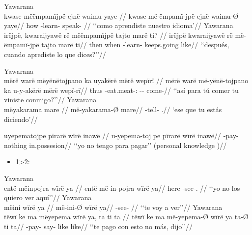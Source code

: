 \documentclass{memoir}
\begin{document}
\pex\label{learn}    \a Yawarana\\
    \label{convhistfamsjm-15}        \begingl
        \glpreamble kwase mëëmpamïjpë ejnë waimu yaye //
        \gla kwase më-ëmpamï-jpë ejnë waimu-Ø yaye//
        \glb how -learn-  speak- //
            \glft ‘‘como aprendiste nuestro idioma’//  
        \endgl 
    \a Yawarana\\
    \label{convhistfamsjm-238}        \begingl
        \glpreamble irëjpë, kwaraijyawë rë mëëmpamïjpë tajto marë ti? //
        \gla irëjpë kwaraijyawë rë më-ëmpamï-jpë tajto marë ti//
        \glb then when  -learn-  keeps.going like//
            \glft ‘‘después, cuando aprediste lo que dices?’’//  
        \endgl 
\xe

\pex\label{2sub}    \a Yawarana\\
    \label{convfemgrme-43}        \begingl
        \glpreamble mërë warë mëyënëtojpano ka uyakërë mërë wepïrï //
        \gla mërë warë më-yënë-tojpano ka u-y-akërë mërë wepï-rï//
        \glb {} thus -eat.meat-:  --  come-//
            \glft ‘‘así para tú comer tu viniste conmigo?’’//  
        \endgl 
    \a Yawarana\\
    \label{ctoaragrme-5}        \begingl
        \glpreamble mëyakarama mare //
        \gla më-yakarama-Ø mare//
        \glb {}-tell- .//
            \glft ‘ese que tu estás diciendo’//  
        \endgl 
\xe

\ex \label{1sub}
\begingl \glpreamble uyepematojpe pïrarë wïrë inawë //
\gla u-yepema-toj pe pïrarë wïrë inawë//
\glb {}-pay-  nothing  in.possesion//
\glft ‘‘yo no tengo para pagar’’ (personal knowledge
)//
\endgl
\xe

\begin{itemize}
\tightlist
\item
  1\textgreater2:
\end{itemize}

\pex\label{}    \a Yawarana\\
   \label{convfemgrme-231}        \begingl
       \glpreamble entë mëinpojra wïrë ya //
       \gla entë më-in-pojra wïrë ya//
       \glb here -see-.  //
           \glft ‘‘yo no los quiero ver aquí’’//  
       \endgl 
   \a Yawarana\\
   \label{convfemgrme-232}        \begingl
       \glpreamble mëini wïrë ya //
       \gla më-ini-Ø wïrë ya//
       \glb {}-see-  //
           \glft ‘‘te voy a ver’’//  
       \endgl 
   \a Yawarana\\
   \label{ctovarmafl-283}        \begingl
       \glpreamble tëwï ke ma mëyepema wïrë ya, ta ti ta //
       \gla tëwï ke ma më-yepema-Ø wïrë ya ta-Ø ti ta//
       \glb {}   -pay-   say- like like//
           \glft ‘‘te pago con esto no más, dijo’’//  
       \endgl 
\xe
\end{document}
